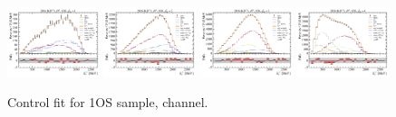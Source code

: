 \begin{figure}[!htb]
    \includegraphics[width=0.24\textwidth]{./figs-fit-fit-results/ctrl-fit/lines_q2_slices/fit_result-lines_q2_idx1-D0-1os-el.pdf}
    \includegraphics[width=0.24\textwidth]{./figs-fit-fit-results/ctrl-fit/lines_q2_slices/fit_result-lines_q2_idx2-D0-1os-el.pdf}
    \includegraphics[width=0.24\textwidth]{./figs-fit-fit-results/ctrl-fit/lines_q2_slices/fit_result-lines_q2_idx3-D0-1os-el.pdf}
    \includegraphics[width=0.24\textwidth]{./figs-fit-fit-results/ctrl-fit/lines_q2_slices/fit_result-lines_q2_idx4-D0-1os-el.pdf}

    \caption{Control fit for 1OS sample, \Dz channel.}
    \label{fig:ctrl-1os-d0}
\end{figure}

